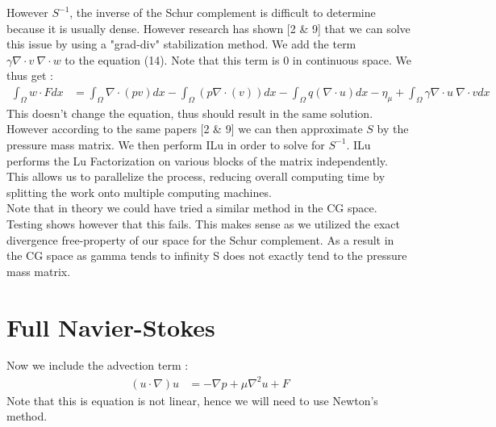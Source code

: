 \documentclass[11pt,twoside,a4paper]{article}
\begin{document}
 However $S^{-1}$, the inverse of the Schur complement is difficult to determine because it is usually dense. However research has shown [2 \& 9] that we can solve this issue by using a "grad-div" stabilization method. We add the term $\gamma \nabla \cdot v \: \nabla \cdot w$ to the equation (14). Note that this term is 0 in continuous space. We thus get :
\begin{align}
\int_\Omega w \cdot F dx &= \int_\Omega \nabla \cdot (p v) dx - \int_\Omega ( p \nabla \cdot (v)) dx - \int_\Omega q (\nabla \cdot u) dx  - \eta_\mu + \int_\Omega \gamma \nabla \cdot u \: \nabla \cdot v dx
\end{align}
This doesn't change the equation, thus should result in the same solution. However according to the same papers [2 \& 9] we can then approximate $S$ by the pressure mass matrix. We then perform ILu in order to solve for $S^{-1}$. ILu performs the Lu Factorization on various blocks of the matrix independently. This allows us to parallelize the process, reducing overall computing time by splitting the work onto multiple computing machines.\\
Note that in theory we could have tried a similar method in the CG space.
Testing shows however that this fails.
This makes sense as we utilized the exact divergence free-property of our space for the Schur complement.
As a result in the CG space as gamma tends to infinity S does not exactly tend to the pressure mass matrix.

\section{Full Navier-Stokes}
Now we include the advection term :
\begin{align*}
(u \cdot \nabla) u &= -\nabla p + \mu \nabla^2 u + F
\end{align*}
Note that this is equation is not linear, hence we will need to use Newton's method.\\
\end{document}
